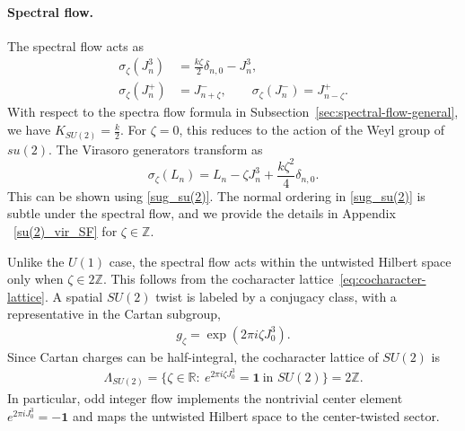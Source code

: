 \documentclass[11pt]{article}
\numberwithin{equation}{section}
\begin{document}
\paragraph{Spectral flow.}
The spectral flow acts as 
\begin{align}
\sigma_\zeta(J_n^3)&=\frac{k\zeta}{2}\delta_{n,0}-J_n^3,
\label{su(2)_J3_SF}\\
\sigma_\zeta(J_n^+)&=J_{n+\zeta}^-,\qquad
\sigma_\zeta(J_n^-)=J_{n-\zeta}^+.
\label{su(2)_Jpm_SF}
\end{align}
 With respect to the spectra flow formula in  Subsection~\ref{sec:spectral-flow-general}, we have $K_{SU(2)}=\frac{k}{2}$.
For $\zeta = 0$, this reduces to the action of the Weyl group of $su(2)$. The Virasoro generators transform as
\begin{equation}
\sigma_\zeta(L_n)=L_n-\zeta J_n^3
 +\frac{k\zeta^2}{4}\delta_{n,0}.
\end{equation}
This can be shown using \eqref{sug_su(2)}. The normal ordering in \eqref{sug_su(2)} is subtle under the spectral flow, and we provide the details in Appendix ~\ref{su(2)_vir_SF} for $\zeta\in \mathbb{Z}$.

Unlike the $U(1)$ case, the spectral flow acts within the untwisted Hilbert space only when $\zeta\in2\mathbb Z$. This follows from the cocharacter lattice~\eqref{eq:cocharacter-lattice}. A spatial $SU(2)$ twist is labeled by a conjugacy class, with a representative in the Cartan subgroup,
\begin{align}
    g_{\zeta}=\exp(2\pi i\zeta J_0^3).
\end{align}
Since Cartan charges can be half-integral, the cocharacter lattice of $SU(2)$ is
\begin{align}
     \Lambda_{SU(2)}=\bigl\{\zeta\in\mathbb R:\ e^{2\pi i\zeta J_0^3}=\mathbf1\ \text{in }SU(2)\bigr\}=2\mathbb Z.
    \label{eq:cocharacter-lattice_SU2}
\end{align}
In particular, odd integer flow implements the nontrivial center element $e^{2\pi iJ_0^3}=-\mathbf1$ and maps the untwisted Hilbert space to the center-twisted sector.
\end{document}
